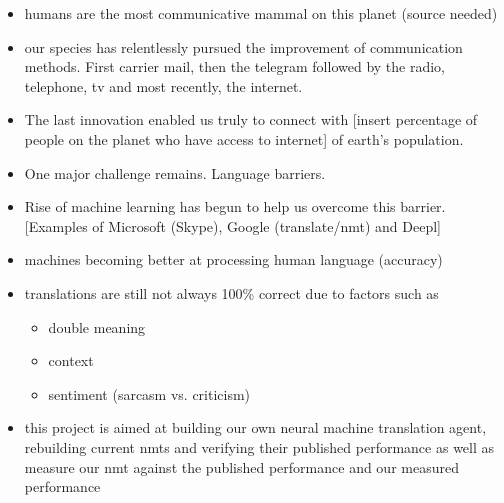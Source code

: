 \documentclass[10pt,a4paper,titlepage,twoside,english]{zhawreprt}
\begin{document}
\begin{itemize}
\item humans are the most communicative mammal on this planet (source needed)
\item our species has relentlessly pursued the improvement of communication methods. First carrier mail, then the telegram followed by the radio, telephone, tv and most recently, the internet.
\item The last innovation enabled us truly to connect with [insert percentage of people on the planet who have access to internet] of earth's population.
\item One major challenge remains. Language barriers.
\item Rise of machine learning has begun to help us overcome this barrier. [Examples of Microsoft (Skype), Google (translate/nmt) and Deepl]
\item machines becoming better at processing human language (accuracy)
\item translations are still not always 100\% correct due to factors such as
\begin{itemize}
\item double meaning
\item context
\item sentiment (sarcasm vs. criticism)
\end{itemize}
\item this project is aimed at building our own neural machine translation agent, rebuilding current nmts and verifying their published performance as well as measure our nmt against the published performance and our measured performance
\end{itemize}
\end{document}

